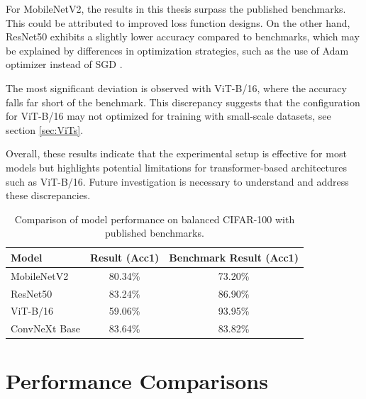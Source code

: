 For MobileNetV2, the results in this thesis surpass the published benchmarks. This could be attributed to improved loss function designs. On the other hand, ResNet50 exhibits a slightly lower accuracy compared to benchmarks, which may be explained by differences in optimization strategies, such as the use of Adam optimizer instead of SGD \cite{menon2021longtaillearninglogitadjustment}.

The most significant deviation is observed with ViT-B/16, where the accuracy falls far short of the benchmark. This discrepancy suggests that the configuration for ViT-B/16 may not optimized for training with small-scale datasets, see section \ref{sec:ViTs}. 

Overall, these results indicate that the experimental setup is effective for most models but highlights potential limitations for transformer-based architectures such as ViT-B/16. Future investigation is necessary to understand and address these discrepancies.

\begin{table}[H]
    \centering
    \caption{Comparison of model performance on balanced CIFAR-100 with published benchmarks.}
    \begin{tabular}{|l|c|c|}
    \hline
    \textbf{Model}        & \textbf{Result (Acc1)} & \textbf{Benchmark Result (Acc1)}  \\ \hline
    MobileNetV2           & 80.34\%               & 73.20\% \cite{park2022bitatneuralnetworkbinarization}  \\ \hline
    ResNet50            & 83.24\%               & 86.90\% \cite{wightman2021resnetstrikesbackimproved}  \\ \hline
    ViT-B/16              & 59.06\%               & 93.95\% \cite{Tseng_2022} \\ \hline
    ConvNeXt Base         & 83.64\%               & 83.82\% \cite{10072172}  \\ \hline
    \end{tabular}
    \label{tab:benchmark_comparison}
\end{table}


\section{Performance Comparisons}

